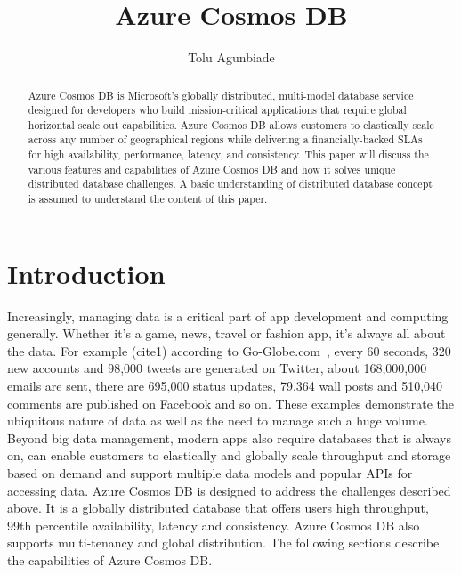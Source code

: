 
\title{Azure Cosmos DB}


\author{Tolu Agunbiade}

\renewcommand{\shortauthors}{T. Agunbiade}


\begin{abstract}
Azure Cosmos DB is Microsoft's globally distributed, multi-model database service designed for developers who build mission-critical applications that require global horizontal scale out capabilities. Azure Cosmos DB allows customers to elastically scale across any number of geographical regions while delivering a financially-backed SLAs for high availability, performance, latency, and consistency.
This paper will discuss the various features and capabilities of Azure Cosmos DB and how it solves unique distributed database challenges.
A basic understanding of distributed database concept is assumed to understand the content of this paper.
\end{abstract}



\maketitle

\section{Introduction}
Increasingly, managing data is a critical part of app development and computing generally. Whether it’s a game, news, travel or fashion app, it’s always all about the data. For example (cite1) according to Go-Globe.com~\cite{hid-sp18-501-chameleon}, every 60 seconds, 320 new accounts and 98,000 tweets are generated on Twitter, about 168,000,000 emails are sent, there are 695,000 status updates, 79,364 wall posts and 510,040 comments are published on Facebook and so on. These examples demonstrate the ubiquitous nature of data as well as the need to manage such a huge volume. Beyond big data management, modern apps also require databases that is always on, can enable customers to elastically and globally scale throughput and storage based on demand and support multiple data models and popular APIs for accessing data.
Azure Cosmos DB is designed to address the challenges described above. It is a globally distributed database that offers users high throughput, 99th percentile availability, latency and consistency. Azure Cosmos DB also supports multi-tenancy and global distribution. The following sections describe the capabilities of Azure Cosmos DB.


